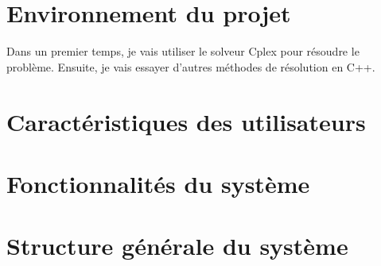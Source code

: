 \section{Environnement du projet}
Dans un premier temps, je vais utiliser le solveur Cplex pour résoudre le problème.
Ensuite, je vais essayer d'autres méthodes de résolution en C++.
\section{Caractéristiques des utilisateurs}

\section{Fonctionnalités du système}

\section{Structure générale du système}